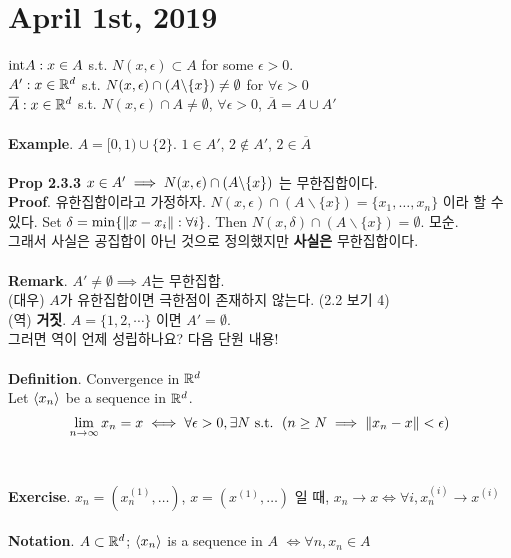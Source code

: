 \section*{April 1st, 2019}
$ \mathrm{int} A : x\in A$ s.t. $N(x, \epsilon) \subset A$ for some $\epsilon > 0$.\\
$A': x\in \mathbb{R}^d$ s.t. $N(x, \epsilon) \cap (A\backslash\{x\})\neq \emptyset$ for $\forall \epsilon >0$\\
$\overline{A}: x\in \mathbb{R}^d$ s.t. $N(x, \epsilon) \cap A\neq\emptyset$, $\forall \epsilon>0$, $\overline{A} = A\cup A'$\\
\\
\textbf{Example}. $A=[0, 1)\cup \{2\}$. $ 1\in A' $, $ 2\notin A' $, $ 2\in \overline{A} $\\
\\
\textbf{Prop 2.3.3} $ x\in A' \implies N(x, \epsilon)\cap (A\backslash \{x\})$ 는 무한집합이다.\\
\textbf{Proof}. 유한집합이라고 가정하자. $N(x, \epsilon) \cap (A\backslash \{x\}) = \{x_1, \dots, x_n\}$ 이라 할 수 있다.
Set $\delta = \min\{\left\lVert x-x_i\right\rVert: \forall i\}$. Then $ N(x, \delta) \cap (A\backslash \{x\})=\emptyset $. 모순.\\
그래서 사실은 공집합이 아닌 것으로 정의했지만 \textbf{사실은} 무한집합이다.\\
\\
\textbf{Remark}. $A'\neq\emptyset\implies A$는 무한집합.\\
(대우) $A$가 유한집합이면 극한점이 존재하지 않는다. (2.2 보기 4)\\
(역) \textbf{거짓}. $A = \{1, 2, \cdots\}$ 이면 $A'=\emptyset$.\\
그러면 역이 언제 성립하나요? 다음 단원 내용!\\
\\
\textbf{Definition}. Convergence in $\mathbb{R}^d$\\
Let $\left\langle x_n \right\rangle$ be a sequence in $\mathbb{R}^d$. $$\lim_{n\rightarrow \infty} x_n= x \iff \forall \epsilon>0, \exists N \text{ s.t. } \left (n\geq N \implies \left\lVert x_n-x\right\rVert<\epsilon\right )$$\\
\\
\textbf{Exercise}. $x_n = (x_n^{(1)}, \dots)$, $x = (x^{(1)}, \dots)$ 일 때, $x_n\rightarrow x \iff \forall i, x_n^{(i)} \rightarrow x^{(i)} $\\
\\
\textbf{Notation}. $A\subset \mathbb{R}^d$; $\left\langle x_n \right\rangle$ is a sequence in $A$ $\iff \forall n, x_n\in A $\\
\\
